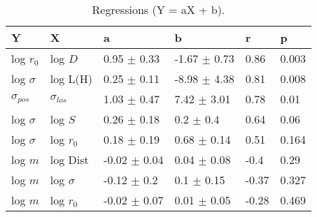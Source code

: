 \begin{table}
\centering
\caption{Regressions (Y = aX + b).}
\begin{tabular}{llllll}
\toprule
              Y &               X &                 a &                 b &      r &      p \\
\midrule
      log $r_0$ &         log $D$ &   0.95 $\pm$ 0.33 &  -1.67 $\pm$ 0.73 &   0.86 &  0.003 \\
   log $\sigma$ &        log L(H) &   0.25 $\pm$ 0.11 &  -8.98 $\pm$ 4.38 &   0.81 &  0.008 \\
 $\sigma_{pos}$ &  $\sigma_{los}$ &   1.03 $\pm$ 0.47 &   7.42 $\pm$ 3.01 &   0.78 &   0.01 \\
   log $\sigma$ &         log $S$ &   0.26 $\pm$ 0.18 &     0.2 $\pm$ 0.4 &   0.64 &   0.06 \\
   log $\sigma$ &     log $r_{0}$ &   0.18 $\pm$ 0.19 &   0.68 $\pm$ 0.14 &   0.51 &  0.164 \\
        log $m$ &        log Dist &  -0.02 $\pm$ 0.04 &   0.04 $\pm$ 0.08 &   -0.4 &   0.29 \\
        log $m$ &    log $\sigma$ &   -0.12 $\pm$ 0.2 &    0.1 $\pm$ 0.15 &  -0.37 &  0.327 \\
        log $m$ &     log $r_{0}$ &  -0.02 $\pm$ 0.07 &   0.01 $\pm$ 0.05 &  -0.28 &  0.469 \\
\bottomrule
\end{tabular}
\end{table}

